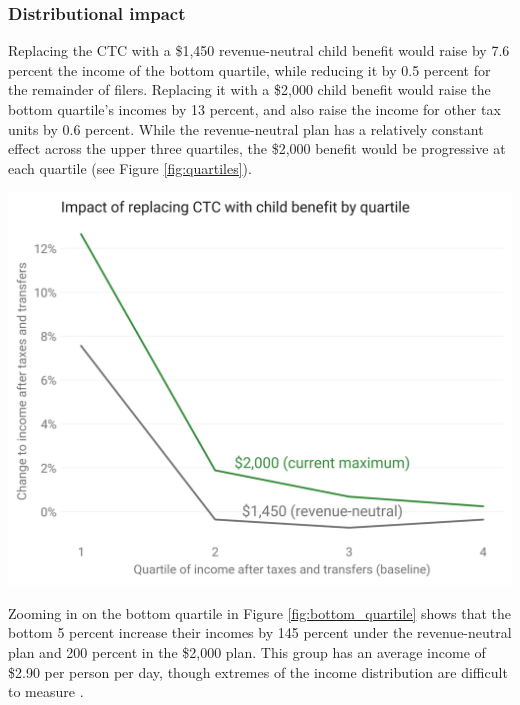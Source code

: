 \documentclass[12pt]{article}
\begin{document}
\subsubsection{Distributional impact}

Replacing the CTC with a \$1,450 revenue-neutral child benefit would raise by 7.6 percent the income of the bottom quartile, while reducing it by 0.5 percent for the remainder of filers. Replacing it with a \$2,000 child benefit would raise the bottom quartile's incomes by 13 percent, and also raise the income for other tax units by 0.6 percent. While the revenue-neutral plan has a relatively constant effect across the upper three quartiles, the \$2,000 benefit would be progressive at each quartile (see Figure \ref{fig:quartiles}).

\begin{center}
\includegraphics[width=15cm]{quartiles.png}
\label{fig:quartiles}
\end{center}

Zooming in on the bottom quartile in Figure \ref{fig:bottom_quartile} shows that the bottom 5 percent increase their incomes by 145 percent under the revenue-neutral plan and 200 percent in the \$2,000 plan. This group has an average income of \$2.90 per person per day, though extremes of the income distribution are difficult to measure \cite{ghenis_bottom_income}.
\end{document}
